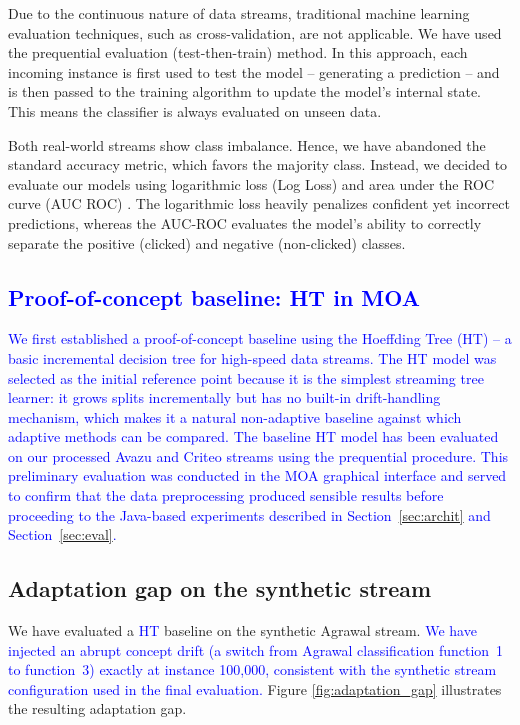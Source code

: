 \documentclass[12pt]{article}
\newcommand{\new}[1]{\textcolor{blue}{#1}}
\begin{document}
Due to the continuous nature of data streams, traditional machine learning evaluation techniques, such as cross-validation, are not applicable. We have used the prequential evaluation (test-then-train) method. In this approach, each incoming instance is first used to test the model -- generating a prediction -- and is then passed to the training algorithm to update the model's internal state. This means the classifier is always evaluated on unseen data. 

Both real-world streams show class imbalance. Hence, we have abandoned the standard accuracy metric, which favors the majority class. Instead, we decided to evaluate our models using logarithmic loss (Log Loss) and area under the ROC curve (AUC ROC) \cite{fawcett2006introduction}. The logarithmic loss heavily penalizes confident yet incorrect predictions, whereas the AUC-ROC evaluates the model's ability to correctly separate the positive (clicked) and negative (non-clicked) classes. 


\subsection{\new{Proof-of-concept baseline: HT in MOA}}
\label{subsec:poc}

\new{We first established a proof-of-concept baseline using the Hoeffding Tree (HT) -- a basic incremental decision tree for high-speed data streams. \new{The HT model was selected as the initial reference point because it is the simplest streaming tree learner: it grows splits incrementally but has no built-in drift-handling mechanism, which makes it a natural non-adaptive baseline against which adaptive methods can be compared.} The baseline HT model has been evaluated on our processed Avazu and Criteo streams using the prequential procedure. This preliminary evaluation was conducted in the MOA graphical interface and served to confirm that the data preprocessing produced sensible results before proceeding to the Java-based experiments described in Section~\ref{sec:archit} and Section~\ref{sec:eval}.}


\subsection{Adaptation gap on the synthetic stream}
\label{subsec:adapt}

We have evaluated a \new{HT} baseline on the synthetic Agrawal stream. \new{We have injected an abrupt concept drift (a switch from Agrawal classification function~1 to function~3) exactly at instance 100,000, consistent with the synthetic stream configuration used in the final evaluation.} Figure \ref{fig:adaptation_gap} illustrates the resulting adaptation gap.
\end{document}
